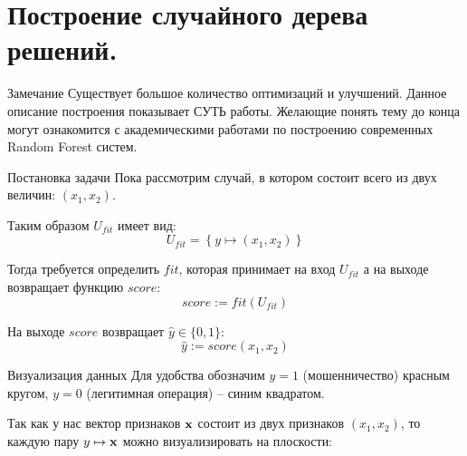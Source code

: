 \section{Построение случайного дерева решений.}\label{section:random_tree_building}

\begin{frame}
	\begin{block}{Замечание}
	Существует большое количество оптимизаций и улучшений. 
	Данное описание построения показывает СУТЬ работы. 
	Желающие понять тему до конца могут ознакомится с академическими работами 
	по построению современных Random Forest систем.
	\end{block}
\end{frame}

\begin{frame}{Постановка задачи}
	Пока рассмотрим случай, в котором  
	состоит всего из двух величин: $(x_1, x_2)$.
	
	Таким образом  $U_{fit}$ имеет вид:
	\begin{equation}
	U_{fit} = \left\{ y \mapsto (x_1, x_2 )\right\}
	\end{equation}
	
	Тогда требуется определить 
	$fit$, которая принимает на
	вход $U_{fit}$ а на выходе возвращает функцию $score$:
	\begin{equation}
	score := fit(U_{fit}) 
	\end{equation}
	
	
	На выходе $score$ возвращает $\hat{y} \in \{0, 1\}$:
	\begin{equation}
	\hat {y} := score(x_1, x_2)
	\end{equation}
\end{frame}

\begin{frame}{Визуализация данных}
	Для удобства обозначим $y=1$ (мошенничество) красным кругом, 
	$y=0$ (легитимная операция) -- синим квадратом.
	
	Так как у нас вектор признаков $\bold x$ состоит из двух признаков $(x_1, x_2)$, 
	то каждую пару 
	$y \mapsto \bold x$
	можно визуализировать на плоскости:
	\begin{center}
	\begin{tikzpicture}[scale=1.5]
	
	\end{tikzpicture}
	\end{center}
\end{frame}

